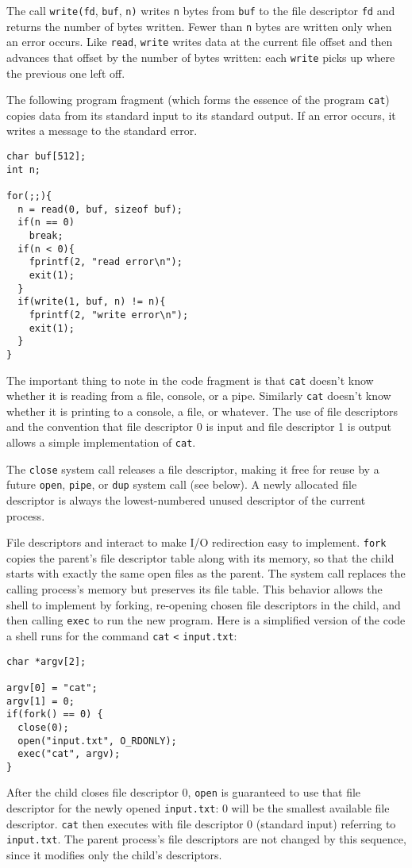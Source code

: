 The call
\lstinline{write(fd},
\lstinline{buf},
\lstinline{n)}
writes
\lstinline{n}
bytes from
\lstinline{buf}
to the file descriptor
\lstinline{fd}
and returns the number of bytes written.
Fewer than
\lstinline{n}
bytes are written only when an error occurs.
Like
\lstinline{read},
\lstinline{write}
writes data at the current file offset and then advances
that offset by the number of bytes written:
each
\lstinline{write}
picks up where the previous one left off.

The following program fragment (which forms the essence of the program
\lstinline{cat})
copies data from its standard input
to its standard output.  If an error occurs, it writes a message
to the standard error.
\begin{lstlisting}[]
char buf[512];
int n;

for(;;){
  n = read(0, buf, sizeof buf);
  if(n == 0)
    break;
  if(n < 0){
    fprintf(2, "read error\n");
    exit(1);
  }
  if(write(1, buf, n) != n){
    fprintf(2, "write error\n");
    exit(1);
  }
}
\end{lstlisting}
The important thing to note in the code fragment is that
\lstinline{cat}
doesn't know whether it is reading from a file, console, or a pipe.
Similarly
\lstinline{cat}
doesn't know whether it is printing to a console, a file, or whatever.
The use of file descriptors and the convention that file descriptor 0
is input and file descriptor 1 is output allows a simple
implementation
of
\lstinline{cat}.

The
\lstinline{close}
system call
releases a file descriptor, making it free for reuse by a future
\lstinline{open},
\lstinline{pipe},
or
\lstinline{dup}
system call (see below).
A newly allocated file descriptor
is always the lowest-numbered unused
descriptor of the current process.

File descriptors and
interact to make I/O redirection easy to implement.
\lstinline{fork}
copies the parent's file descriptor table along with its memory,
so that the child starts with exactly the same open files as the parent.
The system call
replaces the calling process's memory but preserves its file table.
This behavior allows the shell to
implement  by forking,
re-opening chosen file descriptors in the child,
and then calling \lstinline{exec} to run the new program.
Here is a simplified version of the code a shell runs for the
command
\lstinline{cat}
\lstinline{<}
\lstinline{input.txt}:
\begin{lstlisting}[]
char *argv[2];

argv[0] = "cat";
argv[1] = 0;
if(fork() == 0) {
  close(0);
  open("input.txt", O_RDONLY);
  exec("cat", argv);
}
\end{lstlisting}
After the child closes file descriptor 0,
\lstinline{open}
is guaranteed to use that file descriptor
for the newly opened
\lstinline{input.txt}:
0 will be the smallest available file descriptor.
\lstinline{cat}
then executes with file descriptor 0 (standard input) referring to
\lstinline{input.txt}.
The parent process's file descriptors are not changed by this
sequence, since it modifies only the child's descriptors.

